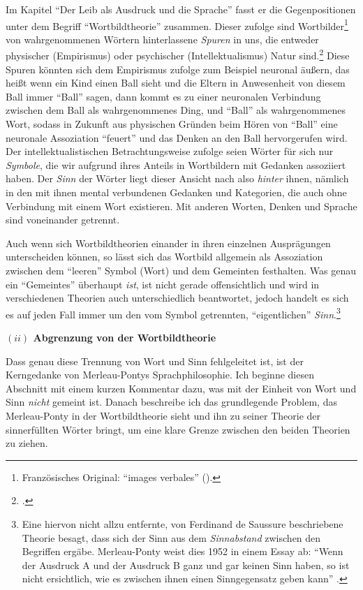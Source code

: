 \documentclass[a4paper, 12pt]{article}
\begin{document}
\begin{onehalfspace}
Im Kapitel "`Der Leib als Ausdruck und die Sprache"' fasst er die Gegenpositionen unter dem Begriff "`Wortbildtheorie"' zusammen. Dieser zufolge sind Wortbilder\footnote{Französisches Original: "`images verbales"' (\Cite[siehe][S. 203]{franzoesisch_phen}).} von wahrgenommenen Wörtern hinterlassene \emph{Spuren} in uns, die entweder physischer (Empirismus) oder psychischer (Intellektualismus) Natur sind.\footnote{\Cite[Vgl.][S. 208]{merleau1966phanomenologie}.} Diese Spuren könnten sich dem Empirismus zufolge zum Beispiel neuronal äußern, das heißt wenn ein Kind einen Ball sieht und die Eltern in Anwesenheit von diesem Ball immer "`Ball"' sagen, dann kommt es zu einer neuronalen Verbindung zwischen dem Ball als wahrgenommenes Ding, und "`Ball"' als wahrgenommenes Wort, sodass in Zukunft aus physischen Gründen beim Hören von "`Ball"' eine neuronale Assoziation "`feuert"' und das Denken an den Ball hervorgerufen wird. Der intellektualistischen Betrachtungsweise zufolge seien Wörter für sich nur \emph{Symbole}, die wir aufgrund ihres Anteils in Wortbildern mit Gedanken assoziiert haben. Der \emph{Sinn} der Wörter liegt dieser Ansicht nach also \emph{hinter} ihnen, nämlich in den mit ihnen mental verbundenen Gedanken und Kategorien, die auch ohne Verbindung mit einem Wort existieren. Mit anderen Worten, Denken und Sprache sind voneinander getrennt.

Auch wenn sich Wortbildtheorien einander in ihren einzelnen Ausprägungen unterscheiden können, so lässt sich das Wortbild allgemein als Assoziation zwischen dem "`leeren"' Symbol (Wort) und dem Gemeinten festhalten. Was genau ein "`Gemeintes"' überhaupt \emph{ist}, ist nicht gerade offensichtlich und wird in verschiedenen Theorien auch unterschiedlich beantwortet, jedoch handelt es sich es auf jeden Fall immer um den vom Symbol getrennten, "`eigentlichen"' \emph{Sinn}.\footnote{Eine hiervon nicht allzu entfernte, von Ferdinand de Saussure beschriebene Theorie besagt, dass sich der Sinn aus dem \emph{Sinnabstand} zwischen den Begriffen ergäbe. Merleau-Ponty weist dies 1952 in einem Essay ab: "`Wenn der Ausdruck A und der Ausdruck B ganz und gar keinen Sinn haben, so ist nicht ersichtlich, wie es zwischen ihnen einen Sinngegensatz geben kann"' .} 

\vspace{5mm}

\noindent\textbf{$(ii)$ Abgrenzung von der Wortbildtheorie}

\noindent Dass genau diese Trennung von Wort und Sinn fehlgeleitet ist, ist der Kerngedanke von Merleau-Pontys Sprachphilosophie. Ich beginne diesen Abschnitt mit einem kurzen Kommentar dazu, was mit der Einheit von Wort und Sinn \emph{nicht} gemeint ist. Danach beschreibe ich das grundlegende Problem, das Merleau-Ponty in der Wortbildtheorie sieht und ihn zu seiner Theorie der sinnerfüllten Wörter bringt, um eine klare Grenze zwischen den beiden Theorien zu ziehen.


\end{onehalfspace}
\end{document}
